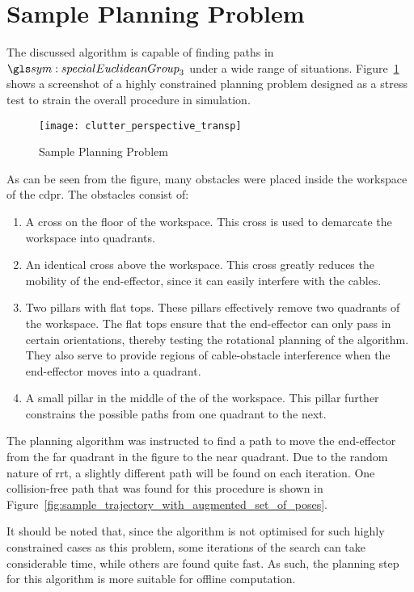 \section{Sample Planning Problem}

	The discussed algorithm is capable of finding paths in
	$\specialEuclideanGroup{3}$ under a wide range of situations.
	Figure~\ref{fig:stress_test_problem} shows a screenshot of a highly
	constrained planning problem designed as a stress test to strain the overall
	procedure in simulation.

	\begin{figure}[ht]
		\texttt{[image: clutter\_perspective\_transp]}
		\caption{Sample Planning Problem}%
		\label{fig:stress_test_problem}
	\end{figure}

	As can be seen from the figure, many obstacles were placed inside the
	workspace of the \gls{cdpr}. The obstacles consist of:

	\begin{enumerate}

		\item

			A cross on the floor of the workspace. This cross is used to
			demarcate the workspace into quadrants.

		\item

			An identical cross above the workspace. This cross greatly reduces
			the mobility of the end-effector, since it can easily interfere with
			the cables.

		\item

			Two pillars with flat tops. These pillars effectively remove two
			quadrants of the workspace. The flat tops ensure that the
			end-effector can only pass in certain orientations, thereby testing
			the rotational planning of the algorithm. They also serve to provide
			regions of cable-obstacle interference when the end-effector moves
			into a quadrant.

		\item

			A small pillar in the middle of the of the workspace. This pillar
			further constrains the possible paths from one quadrant to the next.

	\end{enumerate}

	The planning algorithm was instructed to find a path to move the
	end-effector from the far quadrant in the figure to the near quadrant. Due
	to the random nature of \gls{rrt}, a slightly different path will be
	found on each iteration. One collision-free path that was found for this
	procedure is shown in
	Figure~\ref{fig:sample_trajectory_with_augmented_set_of_poses}.

	It should be noted that, since the algorithm is not optimised for such
	highly constrained cases as this problem, some iterations of the search can
	take considerable time, while others are found quite fast. As such, the
	planning step for this algorithm is more suitable for offline computation.
